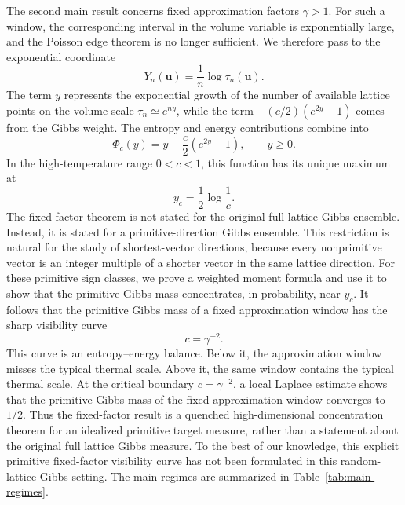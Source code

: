 \documentclass[a4paper,12pt]{article}
\theoremstyle{definition}
\theoremstyle{remark}
\begin{document}
The second main result concerns fixed approximation factors $\gamma>1$.
For such a window, the corresponding interval in the volume variable is
exponentially large, and the Poisson edge theorem is no longer sufficient.
We therefore pass to the exponential coordinate
$$
Y_n(\bm u)=\frac{1}{n}\log\tau_n(\bm u).
$$
The term $y$ represents the exponential growth of the number of available
lattice points on the volume scale $\tau_n\simeq e^{ny}$, while the term
$-(c/2)(e^{2y}-1)$ comes from the Gibbs weight.
The entropy and energy contributions combine into
$$
\Phi_c(y)=y-\frac{c}{2}(e^{2y}-1),\qquad y\ge0.
$$
In the high-temperature range $0<c<1$, this function has its unique maximum at
$$
y_c=\frac{1}{2}\log\frac{1}{c}.
$$
%
The fixed-factor theorem is not stated for the original full lattice Gibbs ensemble.
Instead, it is stated for a primitive-direction Gibbs ensemble.
This restriction is natural for the study of shortest-vector directions,
because every nonprimitive vector is an integer multiple of a shorter
vector in the same lattice direction.
For these primitive sign classes, we prove a weighted moment formula and use it
to show that the primitive Gibbs mass concentrates, in probability, near $y_c$.
It follows that the primitive Gibbs mass of a fixed approximation window has
the sharp visibility curve
$$
c=\gamma^{-2}.
$$
This curve is an entropy--energy balance.
Below it, the approximation window misses the typical thermal scale.
Above it, the same window contains the typical thermal scale.
At the critical boundary $c=\gamma^{-2}$, a local Laplace estimate shows that
the primitive Gibbs mass of the fixed approximation window converges to $1/2$.
Thus the fixed-factor result is a quenched high-dimensional concentration
theorem for an idealized primitive target measure, rather than a statement
about the original full lattice Gibbs measure.
To the best of our knowledge, this explicit primitive fixed-factor visibility
curve has not been formulated in this random-lattice Gibbs setting.
The main regimes are summarized in Table~\ref{tab:main-regimes}.
\end{document}
